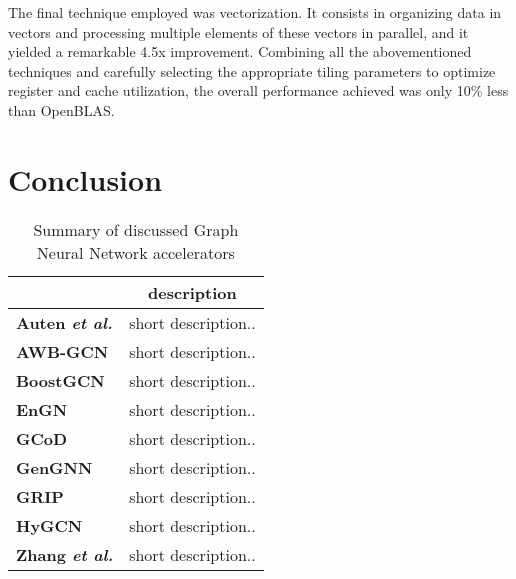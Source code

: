 The final technique employed was vectorization.
It consists in organizing data in vectors and processing multiple elements of these vectors in parallel, and it yielded a remarkable 4.5x improvement.
Combining all the abovementioned techniques and carefully selecting the appropriate tiling parameters to optimize register and cache utilization, the overall performance achieved was only 10\% less than OpenBLAS.

\section{Conclusion}
\label{sec:relater-work-conclusion}


\begin{table}[H]
\centering
    \begin{tabular}{|p{8em} c|}
    \hline
     & \textbf{description}  \\
    \hline \hline
    \textbf{Auten \textit{et al.}} & short description..  \\
    \hline
    \textbf{AWB-GCN} & short description..  \\
    \hline
    \textbf{BoostGCN} & short description..  \\
    \hline
    \textbf{EnGN} & short description..  \\
    \hline
    \textbf{GCoD} & short description..  \\
    \hline
    \textbf{GenGNN} & short description..  \\
    \hline
    \textbf{GRIP} & short description..  \\
    \hline
    \textbf{HyGCN} & short description..  \\
    \hline
    \textbf{Zhang \textit{et al.}} & short description..  \\
    \hline
    \end{tabular}
    \\[10pt]
    \caption{Summary of discussed Graph Neural Network accelerators}
    \label{tab:accelerators-summary}
\end{table}
